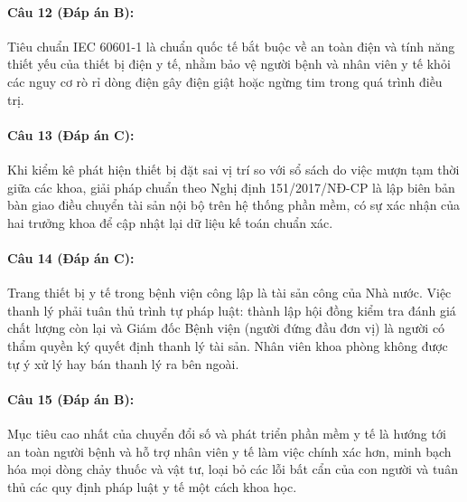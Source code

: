 \documentclass[12pt,a4paper]{article}
\begin{document}
\paragraph{\textbf{Câu 12 (Đáp án B):}} Tiêu chuẩn IEC 60601-1 là chuẩn quốc tế bắt buộc về an toàn điện và tính năng thiết yếu của thiết bị điện y tế, nhằm bảo vệ người bệnh và nhân viên y tế khỏi các nguy cơ rò rỉ dòng điện gây điện giật hoặc ngừng tim trong quá trình điều trị.

\paragraph{\textbf{Câu 13 (Đáp án C):}} Khi kiểm kê phát hiện thiết bị đặt sai vị trí so với sổ sách do việc mượn tạm thời giữa các khoa, giải pháp chuẩn theo Nghị định 151/2017/NĐ-CP là lập biên bản bàn giao điều chuyển tài sản nội bộ trên hệ thống phần mềm, có sự xác nhận của hai trưởng khoa để cập nhật lại dữ liệu kế toán chuẩn xác.

\paragraph{\textbf{Câu 14 (Đáp án C):}} Trang thiết bị y tế trong bệnh viện công lập là tài sản công của Nhà nước. Việc thanh lý phải tuân thủ trình tự pháp luật: thành lập hội đồng kiểm tra đánh giá chất lượng còn lại và Giám đốc Bệnh viện (người đứng đầu đơn vị) là người có thẩm quyền ký quyết định thanh lý tài sản. Nhân viên khoa phòng không được tự ý xử lý hay bán thanh lý ra bên ngoài.

\paragraph{\textbf{Câu 15 (Đáp án B):}} Mục tiêu cao nhất của chuyển đổi số và phát triển phần mềm y tế là hướng tới an toàn người bệnh và hỗ trợ nhân viên y tế làm việc chính xác hơn, minh bạch hóa mọi dòng chảy thuốc và vật tư, loại bỏ các lỗi bất cẩn của con người và tuân thủ các quy định pháp luật y tế một cách khoa học.
\end{document}
